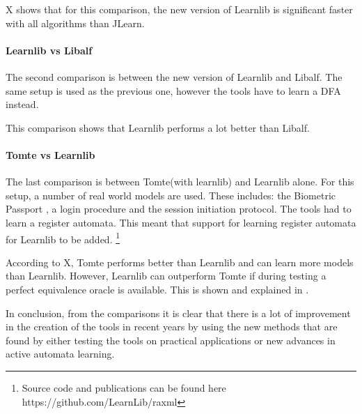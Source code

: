 \documentclass[multi,crop=false,class=article]{standalone}
\begin{document}
X shows that for this comparison, the new version of Learnlib is
significant faster with all algorithms than JLearn.

\paragraph{Learnlib vs Libalf}
The second comparison is between the new version of Learnlib and Libalf.
The same setup is used as the previous one, however the tools have to learn a
DFA instead.

This comparison shows that Learnlib performs a lot better than Libalf.

\paragraph{Tomte vs Learnlib}
The last comparison is between Tomte(with learnlib) and Learnlib alone.
For this setup, a number of real world models are used. These includes: the
Biometric Passport \cite{Aarts2010}, a login procedure and the session
initiation protocol. The tools had to learn a register automata. This meant
that support for learning register automata for Learnlib to be added.
\footnote{Source code and publications can be found here
https://github.com/LearnLib/raxml}

According to X, Tomte performs better than Learnlib and can learn more models
than Learnlib. However, Learnlib can outperform Tomte if during testing a
perfect equivalence oracle is available. This is shown and explained in
\cite{Aarts2014}.



In conclusion, from the comparisons it is clear that there is a lot of
improvement in the creation of the tools in recent years by using the new
methods that are found by either testing the tools on practical applications or
new advances in active automata learning.
\end{document}
